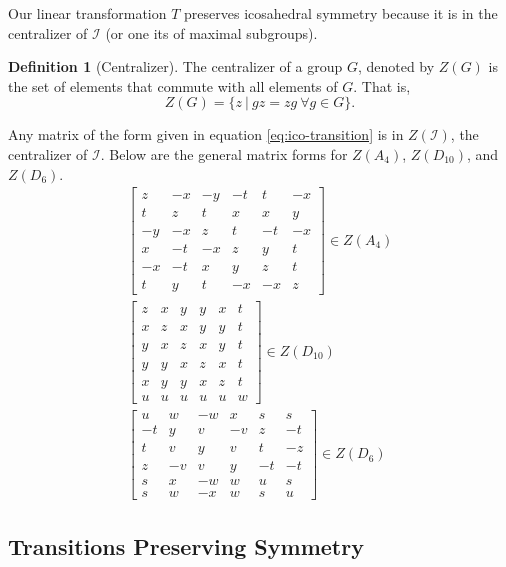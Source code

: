 \documentclass[a4paper,10pt]{article}
\theoremstyle{plain}
\theoremstyle{definition}
\newtheorem{Definition}[Theorem]{Definition}
\theoremstyle{remark}
\begin{document}
Our linear transformation \(T\) preserves icosahedral symmetry because it is in the centralizer of \(\mathcal{I}\) (or one its of maximal subgroups).
\begin{Definition}[Centralizer]
	The centralizer of a group \(G\), denoted by \(Z(G)\) is the set of elements that commute with all elements of \(G\).
	That is, \[Z(G) = \{z\ |\ gz = zg\ \forall g \in G\}.\]
\end{Definition}
Any matrix of the form given in equation \ref{eq:ico-transition} is in \(Z(\mathcal{I})\), the centralizer of \(\mathcal{I}\).
Below are the general matrix forms for \(Z(A_4)\), \(Z(D_{10})\), and \(Z(D_6)\). \cite{indelicatoetal2012}
\begin{align}
	\begin{bmatrix}
		z  & -x & -y & -t & t  & -x \\
		t  & z  & t  & x  & x  & y  \\
		-y & -x & z  & t  & -t & -x \\
		x  & -t & -x & z  & y  & t  \\
		-x & -t & x  & y  & z  & t  \\
		t  & y  & t  & -x & -x & z
	\end{bmatrix} \in Z(A_4) \\
	\begin{bmatrix}
		z & x & y & y & x & t \\
		x & z & x & y & y & t \\
		y & x & z & x & y & t \\
		y & y & x & z & x & t \\
		x & y & y & x & z & t \\
		u & u & u & u & u & w
	\end{bmatrix} \in Z(D_{10}) \\
	\begin{bmatrix}
		u  & w  & -w & x  & s  & s  \\
		-t & y  & v  & -v & z  & -t \\
		t  & v  & y  & v  & t  & -z \\
		z  & -v & v  & y  & -t & -t \\
		s  & x  & -w & w  & u  & s  \\
		s  & w  & -x & w  & s  & u
	\end{bmatrix} \in Z(D_{6})
\end{align}

\subsection{Transitions Preserving Symmetry}
\end{document}
